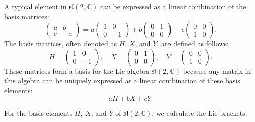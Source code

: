 \documentclass{article}
\begin{document}
A typical element in \(\mathfrak{sl}(2, \mathbb{C})\) can be expressed as a linear combination of the basis matrices:
\[
\begin{pmatrix} a & b \\ c & -a \end{pmatrix} = a \begin{pmatrix} 1 & 0 \\ 0 & -1 \end{pmatrix} + b \begin{pmatrix} 0 & 1 \\ 0 & 0 \end{pmatrix} + c \begin{pmatrix} 0 & 0 \\ 1 & 0 \end{pmatrix}.
\]
The basis matrices, often denoted as \(H\), \(X\), and \(Y\), are defined as follows:
\[
H = \begin{pmatrix} 1 & 0 \\ 0 & -1 \end{pmatrix}, \quad X = \begin{pmatrix} 0 & 1 \\ 0 & 0 \end{pmatrix}, \quad Y = \begin{pmatrix} 0 & 0 \\ 1 & 0 \end{pmatrix}.
\]
These matrices form a basis for the Lie algebra \(\mathfrak{sl}(2, \mathbb{C})\) because any matrix in this algebra can be uniquely expressed as a linear combination of these basis elements:
\[
aH + bX + cY.
\]

For the basis elements \(H\), \(X\), and \(Y\) of \(\mathfrak{sl}(2, \mathbb{C})\), we calculate the Lie brackets:
\end{document}
